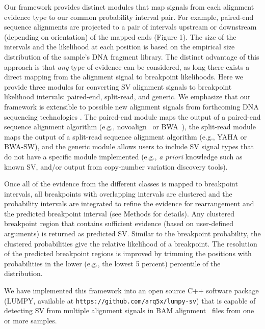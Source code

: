 \documentclass[10pt]{bmc_article}
\def\texttt{[image: ]}
\newenvironment{bmcformat}{\begin{raggedright}\baselineskip20pt\sloppy\setboolean{publ}{false}}{\end{raggedright}\baselineskip20pt\sloppy}
\begin{document}
\begin{bmcformat}
Our framework provides distinct modules that map signals from each alignment
evidence type to our common probability interval pair.  For example, paired-end
sequence alignments are projected to a pair of intervals upstream or downstream
(depending on orientation) of the mapped ends (Figure 1).  The size of the
intervals and the likelihood at each position is based on the empirical size
distribution of the sample's DNA fragment library.  The distinct advantage of
this approach is that \emph{any} type of evidence can be considered, as long
there exists a direct mapping from the alignment signal to breakpoint
likelihoods.  Here we provide three modules for converting SV alignment signals
to breakpoint likelihood intervals: paired-end, split-read, and generic.  We
emphasize that our framework is extensible to possible new alignment signals
from forthcoming DNA sequencing technologies \cite{clarke2009}. The paired-end
module maps the output of a paired-end sequence alignment algorithm
(e.g., novoalign~\cite{hercus2013} or BWA~\cite{li2009a}), the split-read module
maps the output of a split-read sequence alignment algorithm (e.g.,
YAHA\cite{faust2012} or BWA-SW\cite{li2010}), and the generic module allows
users to include SV signal types that do not have a specific module implemented
(e.g., \emph{a priori} knowledge such as known SV, and/or output from
copy-number variation discovery tools).

Once all of the evidence from the different classes is mapped to breakpoint
intervals, all breakpoints with overlapping intervals are clustered and
the probability intervals are integrated to refine the evidence for
rearrangement and the predicted breakpoint interval (see Methods for details). 
Any clustered breakpoint region that contains sufficient evidence (based on
user-defined arguments) is returned as predicted SV. 
Similar to the breakpoint probability, the clustered probabilities give the
relative likelihood of a breakpoint.  The resolution of the predicted breakpoint
regions is improved by trimming the positions with probabilities
in the lower (e.g., the lowest 5 percent) percentile of the distribution.

We have implemented this framework into an open source C++ software package
(LUMPY, available at {\tt https://github.com/arq5x/lumpy-sv})
that is capable of detecting SV from multiple alignment signals in BAM
alignment~\cite{li2009b} files from one or more samples. 



\end{bmcformat}
\end{document}
